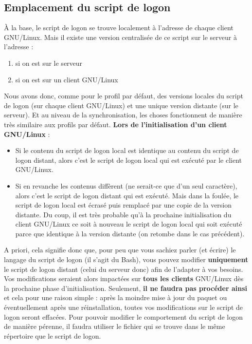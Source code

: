 \subsection{Emplacement du script de logon}

À la base, le script de logon se trouve localement
à l'adresse 
de chaque client GNU/Linux. Mais il existe une version centralisée
de ce script sur le serveur à l'adresse :
%
\begin{enumerate}
\item {} si on est sur le serveur
\item {} si on est sur un client GNU/Linux
\end{enumerate}
%
Nous avons donc, comme pour le profil par défaut, des versions
locales du script de logon (sur chaque client GNU/Linux)
et une unique version distante (sur le serveur).
Et au niveau de la synchronisation,
les choses fonctionnent de manière très similaire aux profils par défaut.
\textbf{Lors de l'initialisation d'un client GNU/Linux} :
%
\begin{itemize}
\item Si le contenu du script de logon local est identique au contenu
du script de logon distant, alors c'est le script de logon local qui est
exécuté par le client GNU/Linux.
\item Si en revanche les contenus diffèrent (ne serait-ce que d'un seul
caractère), alors c'est le script de logon distant qui est exécuté. Mais
dans la foulée, le script de logon local est écrasé puis remplacé par une
copie de la version
distante. Du coup, il est très probable qu'à la prochaine initialisation
du client GNU/Linux ce soit à nouveau le script de logon local qui soit exécuté
parce que identique à la version distante (on retombe dans le cas précédent).
\end{itemize}

A priori, cela signifie donc que, pour peu que vous sachiez parler (et écrire) le
langage du script de logon (il s'agit du Bash), vous pouvez modifier
\textbf{uniquement} le script de logon distant (celui du serveur donc)
afin de l'adapter à vos
besoins. Vos modifications seraient alors impactées sur \textbf{tous les clients}
GNU/Linux dès la prochaine phase d'initialisation.
Seulement, \textbf{il ne faudra pas procéder ainsi}
et cela pour une raison simple :
après la moindre mise à jour du paquet  ou
éventuellement après une réinstallation, toutes vos modifications sur
le script de logon seront effacées. Pour pouvoir modifier le comportement du script
de logon de manière pérenne, il faudra utiliser le fichier
 qui se trouve dans le même répertoire que le
script de logon.



